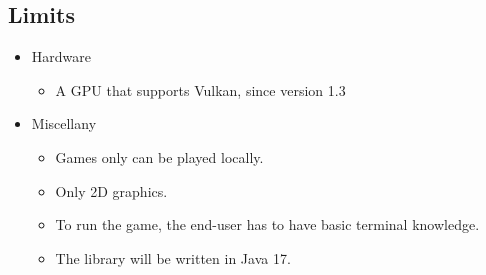 \documentclass{article}
\begin{document}
\subsection{Limits}
\begin{itemize}
    \item Hardware
    \begin{itemize}
        \item A GPU that supports Vulkan, since version 1.3
    \end{itemize}
    \item Miscellany
    \begin{itemize}
        \item Games only can be played locally.
        \item Only 2D graphics.
        \item To run the game, the end-user has to have basic terminal knowledge.
        \item The library will be written in Java 17.
    \end{itemize}
\end{itemize}
\end{document}
